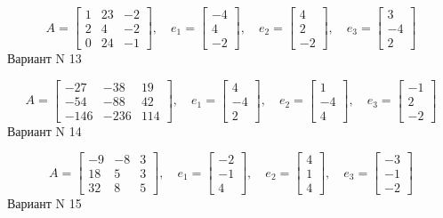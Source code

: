 \documentclass[11pt]{report}
\begin{document}
$$A = \left[\begin{matrix}1 & 23 & -2\\2 & 4 & -2\\0 & 24 & -1\end{matrix}\right],\quad e_1 = \left[\begin{matrix}-4\\4\\-2\end{matrix}\right],\quad e_2 = \left[\begin{matrix}4\\2\\-2\end{matrix}\right],\quad e_3 = \left[\begin{matrix}3\\-4\\2\end{matrix}\right]$$Вариант N 13

$$A = \left[\begin{matrix}-27 & -38 & 19\\-54 & -88 & 42\\-146 & -236 & 114\end{matrix}\right],\quad e_1 = \left[\begin{matrix}4\\-4\\2\end{matrix}\right],\quad e_2 = \left[\begin{matrix}1\\-4\\4\end{matrix}\right],\quad e_3 = \left[\begin{matrix}-1\\2\\-2\end{matrix}\right]$$Вариант N 14

$$A = \left[\begin{matrix}-9 & -8 & 3\\18 & 5 & 3\\32 & 8 & 5\end{matrix}\right],\quad e_1 = \left[\begin{matrix}-2\\-1\\4\end{matrix}\right],\quad e_2 = \left[\begin{matrix}4\\1\\4\end{matrix}\right],\quad e_3 = \left[\begin{matrix}-3\\-1\\-2\end{matrix}\right]$$Вариант N 15
\end{document}
